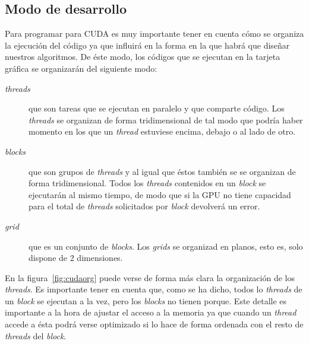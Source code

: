 \subsection{Modo de desarrollo}

Para programar para CUDA es muy importante tener en cuenta cómo se organiza la ejecución del código ya que influirá en la forma en la que habrá que diseñar nuestros algoritmos. De éste modo, los códigos que se ejecutan en la tarjeta gráfica se organizarán del siguiente modo:

\begin{description}
	\item[\emph{threads}] que son tareas que se ejecutan en paralelo y que comparte código. Los \emph{threads} se organizan de forma tridimensional de tal modo que podría haber momento en los que un \emph{thread} estuviese encima, debajo o al lado de otro.
	\item[\emph{blocks}] que son grupos de \emph{threads} y al igual que éstos también se se organizan de forma tridimensional. Todos los \emph{threads} contenidos en un \emph{block} se ejecutarán al mismo tiempo, de modo que si la GPU no tiene capacidad para el total de \emph{threads} solicitados por \emph{block} devolverá un error.
	\item[\emph{grid}] que es un conjunto de \emph{blocks}. Los \emph{grids} se organizad en planos, esto es, solo dispone de 2 dimensiones.
\end{description}

En la figura~\ref{fig:cudaorg} puede verse de forma más clara la organización de los \emph{threads}. Es importante tener en cuenta que, como se ha dicho, todos lo \emph{threads} de un \emph{block} se ejecutan a la vez, pero los \emph{blocks} no tienen porque. Este detalle es importante a la hora de ajustar el acceso a la memoria ya que cuando un \emph{thread} accede a ésta podrá verse optimizado si lo hace de forma ordenada con el resto de \emph{threads} del \emph{block}.

